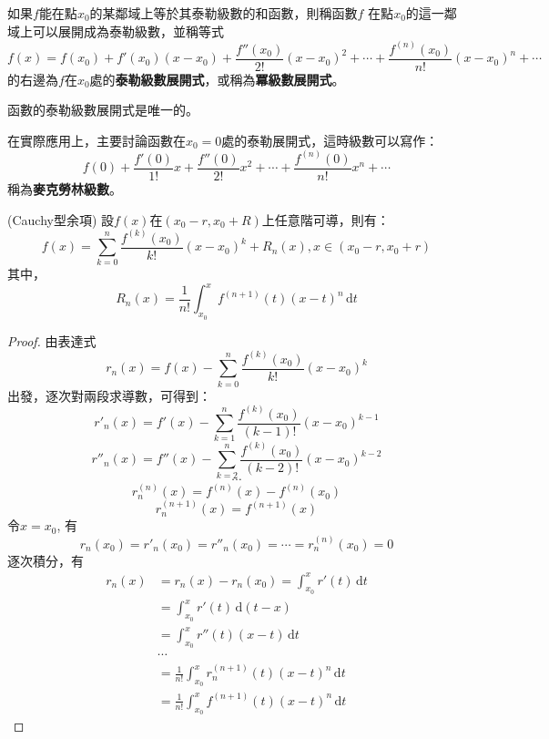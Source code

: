 \documentclass[a4paper,12pt]{article}
\theoremstyle{theorem}
\begin{document}
\begin{CJK*}{UTF8}{bsmi}
    如果$f$能在點$x_0$的某鄰域上等於其泰勒級數的和函數，則稱函數$f$
    在點$x_0$的這一鄰域上可以展開成為泰勒級數，並稱等式
    \begin{equation}
        f(x) = f(x_0) + f'(x_0)(x - x_0) + \frac{f''(x_0)}{2!}(x - x_0)^2 
               + \cdots + \frac{f^{(n)}(x_0)}{n!}(x - x_0)^n + \cdots
               \label{eq:eq11}
    \end{equation}
    的右邊為$f$在$x_0$處的\textbf{泰勒級數展開式}，或稱為\textbf{冪級數展開式}。

    \begin{remark}
        函數的泰勒級數展開式是唯一的。
    \end{remark}

    在實際應用上，主要討論函數在$x_0 = 0$處的泰勒展開式，這時級數可以寫作：
    \[
        f(0) + \frac{f'(0)}{1!}x + \frac{f''(0)}{2!}x^2 + \cdots 
             + \frac{f^{(n)}(0)}{n!}x^n + \cdots 
    \]
    稱為\textbf{麥克勞林級數}。

    \begin{theorem}{\rm (Cauchy型余項)}
        設$f(x)$在$(x_0-r, x_0+R)$上任意階可導，則有：
        \[
            f(x) = \sum_{k=0}^{n} \frac{f^{(k)}(x_0)}{k!}(x - x_0)^k 
                   + R_n(x), x \in (x_0-r, x_0+r)
        \]
        其中，
        \begin{equation}
            R_n(x) = \frac{1}{n!}\int_{x_0}^{x} f^{(n+1)}(t)(x - t)^n\,
                     \mathrm{d}t
        \end{equation}
    \end{theorem}

    \begin{proof}
        由表達式
        \[
            r_n(x) = f(x) - \sum_{k=0}^{n}\frac{f^{(k)}(x_0)}{k!}(x - x_0)^k
        \]
         出發，逐次對兩段求導數，可得到：
        \[
            r'_n(x) = f'(x) - \sum_{k=1}^{n}\frac{f^{(k)}(x_0)}{(k-1)!}(x - x_0)^{k-1}
        \]
        \[
            r''_n(x) = f''(x) - \sum_{k=2}^{n}\frac{f^{(k)}(x_0)}{(k-2)!}(x - x_0)^{k-2}
        \]
        \[
            \cdots
        \]
        \[
            r_n^{(n)}(x) = f^{(n)}(x) - f^{(n)}(x_0)
        \]
        \[
            r_n^{(n+1)}(x) = f^{(n+1)}(x) 
        \]
        令$x = x_0$, 有
        \[
            r_n(x_0) = r'_n(x_0) = r''_n(x_0) = \cdots = r_n^{(n)}(x_0) = 0
        \]
        逐次積分，有
        \[
            \begin{split}
                r_n(x) & = r_n(x) - r_n(x_0) = \int_{x_0}^{x}r'(t)\,\mathrm{d}t \\
                       & = \int_{x_0}^{x}r'(t)\,\mathrm{d}(t - x) \\
                       & = \int_{x_0}^{x}r''(t)(x - t)\,\mathrm{d}t \\
                       & \cdots \\
                       & = \frac{1}{n!}\int_{x_0}^{x}r_n^{(n+1)}(t)(x - t)^n\, 
                           \mathrm{d}t \\
                       & = \frac{1}{n!}\int_{x_0}^{x}f^{(n+1)}(t)(x - t)^n\, 
                           \mathrm{d}t 
            \end{split}
        \]
    \end{proof}
    

\end{CJK*}
\end{document}
